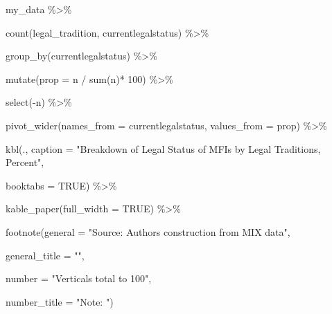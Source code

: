 \documentclass[a4paper,nobind]{templates/ociamthesis}
\newenvironment{Shaded}{\begin{snugshade}}{\end{snugshade}}
\newcommand{\AttributeTok}[1]{\textcolor[rgb]{0.77,0.63,0.00}{#1}}
\newcommand{\ConstantTok}[1]{\textcolor[rgb]{0.00,0.00,0.00}{#1}}
\newcommand{\DecValTok}[1]{\textcolor[rgb]{0.00,0.00,0.81}{#1}}
\newcommand{\FunctionTok}[1]{\textcolor[rgb]{0.00,0.00,0.00}{#1}}
\newcommand{\NormalTok}[1]{#1}
\newcommand{\SpecialCharTok}[1]{\textcolor[rgb]{0.00,0.00,0.00}{#1}}
\newcommand{\StringTok}[1]{\textcolor[rgb]{0.31,0.60,0.02}{#1}}
\renewenvironment{Shaded}
{
  \vspace{10pt}%
  \begin{snugshade}%
}{%
  \end{snugshade}%
  \vspace{8pt}%
}
\begin{document}
\begin{Shaded}
\begin{Highlighting}[]
\NormalTok{my\_data }\SpecialCharTok{\%\textgreater{}\%} 
  
  \FunctionTok{count}\NormalTok{(legal\_tradition, currentlegalstatus) }\SpecialCharTok{\%\textgreater{}\%} 
  
  \FunctionTok{group\_by}\NormalTok{(currentlegalstatus) }\SpecialCharTok{\%\textgreater{}\%} 
  
  \FunctionTok{mutate}\NormalTok{(}\AttributeTok{prop =}\NormalTok{ n }\SpecialCharTok{/} \FunctionTok{sum}\NormalTok{(n)}\SpecialCharTok{*} \DecValTok{100}\NormalTok{) }\SpecialCharTok{\%\textgreater{}\%} 
  
  \FunctionTok{select}\NormalTok{(}\SpecialCharTok{{-}}\NormalTok{n) }\SpecialCharTok{\%\textgreater{}\%} 

  \FunctionTok{pivot\_wider}\NormalTok{(}\AttributeTok{names\_from =}\NormalTok{ currentlegalstatus, }\AttributeTok{values\_from =}\NormalTok{ prop) }\SpecialCharTok{\%\textgreater{}\%} 
  
  \FunctionTok{kbl}\NormalTok{(., }\AttributeTok{caption =} \StringTok{"Breakdown of Legal Status of MFIs by Legal Traditions, Percent"}\NormalTok{, }
      
      \AttributeTok{booktabs =} \ConstantTok{TRUE}\NormalTok{) }\SpecialCharTok{\%\textgreater{}\%} 
  
  \FunctionTok{kable\_paper}\NormalTok{(}\AttributeTok{full\_width =} \ConstantTok{TRUE}\NormalTok{) }\SpecialCharTok{\%\textgreater{}\%} 
  
  \FunctionTok{footnote}\NormalTok{(}\AttributeTok{general =} \StringTok{"Source: Authors\textquotesingle{} construction from MIX data"}\NormalTok{,}
           
           \AttributeTok{general\_title =} \StringTok{""}\NormalTok{,}
           
           \AttributeTok{number =} \StringTok{"Verticals total to 100"}\NormalTok{,}
           
           \AttributeTok{number\_title =} \StringTok{"Note: "}\NormalTok{)}
\end{Highlighting}
\end{Shaded}
\end{document}
